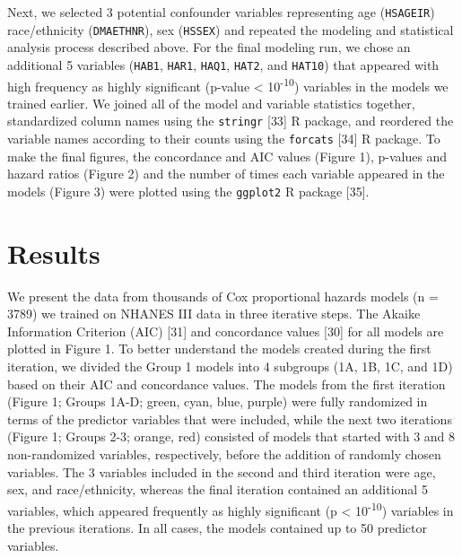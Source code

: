 \documentclass[12pt,oneside]{reedthesis}
\theoremstyle{definition}
\theoremstyle{definition}
\theoremstyle{definition}
\theoremstyle{remark}
\begin{document}
Next, we selected 3 potential confounder variables representing age
(\texttt{HSAGEIR}) race/ethnicity (\texttt{DMAETHNR}), sex
(\texttt{HSSEX}) and repeated the modeling and statistical analysis
process described above. For the final modeling run, we chose an
additional 5 variables (\texttt{HAB1}, \texttt{HAR1}, \texttt{HAQ1},
\texttt{HAT2}, and \texttt{HAT10}) that appeared with high frequency as
highly significant (p-value \textless{} 10\textsuperscript{-10})
variables in the models we trained earlier. We joined all of the model
and variable statistics together, standardized column names using the
\texttt{stringr} {[}33{]} R package, and reordered the variable names
according to their counts using the \texttt{forcats} {[}34{]} R package.
To make the final figures, the concordance and AIC values (Figure 1),
p-values and hazard ratios (Figure 2) and the number of times each
variable appeared in the models (Figure 3) were plotted using the
\texttt{ggplot2} R package {[}35{]}.

\hypertarget{results}{%
\section*{Results}\label{results}}

We present the data from thousands of Cox proportional hazards models (n
= 3789) we trained on NHANES III data in three iterative steps. The
Akaike Information Criterion (AIC) {[}31{]} and concordance values
{[}30{]} for all models are plotted in Figure 1. To better understand
the models created during the first iteration, we divided the Group 1
models into 4 subgroups (1A, 1B, 1C, and 1D) based on their AIC and
concordance values. The models from the first iteration (Figure 1;
Groups 1A-D; green, cyan, blue, purple) were fully randomized in terms
of the predictor variables that were included, while the next two
iterations (Figure 1; Groups 2-3; orange, red) consisted of models that
started with 3 and 8 non-randomized variables, respectively, before the
addition of randomly chosen variables. The 3 variables included in the
second and third iteration were age, sex, and race/ethnicity, whereas
the final iteration contained an additional 5 variables, which appeared
frequently as highly significant (p \textless{} 10\textsuperscript{-10})
variables in the previous iterations. In all cases, the models contained
up to 50 predictor variables.
\end{document}
